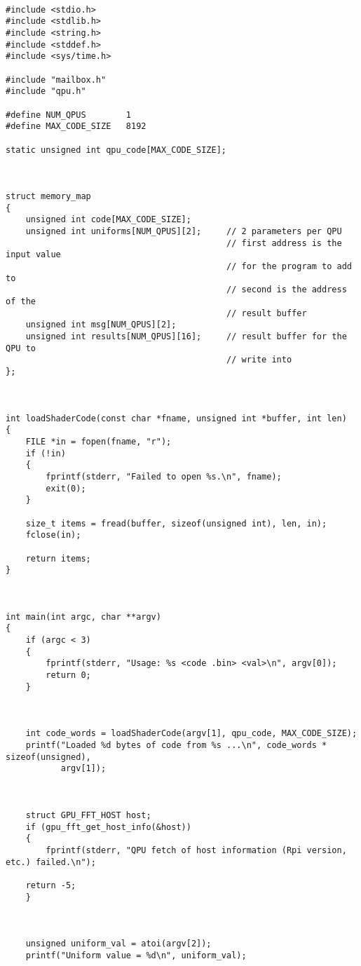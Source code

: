 \begin{lstlisting}

#include <stdio.h>
#include <stdlib.h>
#include <string.h>
#include <stddef.h>
#include <sys/time.h>

#include "mailbox.h"
#include "qpu.h"

#define NUM_QPUS        1
#define MAX_CODE_SIZE   8192

static unsigned int qpu_code[MAX_CODE_SIZE];



struct memory_map
{
    unsigned int code[MAX_CODE_SIZE];
    unsigned int uniforms[NUM_QPUS][2];     // 2 parameters per QPU
                                            // first address is the input value
                                            // for the program to add to
                                            // second is the address of the
                                            // result buffer
    unsigned int msg[NUM_QPUS][2];
    unsigned int results[NUM_QPUS][16];     // result buffer for the QPU to
                                            // write into
};



int loadShaderCode(const char *fname, unsigned int *buffer, int len)
{
    FILE *in = fopen(fname, "r");
    if (!in)
    {
        fprintf(stderr, "Failed to open %s.\n", fname);
        exit(0);
    }

    size_t items = fread(buffer, sizeof(unsigned int), len, in);
    fclose(in);

    return items;
}



int main(int argc, char **argv)
{
    if (argc < 3)
    {
        fprintf(stderr, "Usage: %s <code .bin> <val>\n", argv[0]);
        return 0;
    }



    int code_words = loadShaderCode(argv[1], qpu_code, MAX_CODE_SIZE);
    printf("Loaded %d bytes of code from %s ...\n", code_words * sizeof(unsigned),
           argv[1]);



    struct GPU_FFT_HOST host;
    if (gpu_fft_get_host_info(&host))
    {
        fprintf(stderr,	"QPU fetch of host information (Rpi version, etc.) failed.\n");

	return -5;
    }



    unsigned uniform_val = atoi(argv[2]);
    printf("Uniform value = %d\n", uniform_val);




\end{lstlisting}
